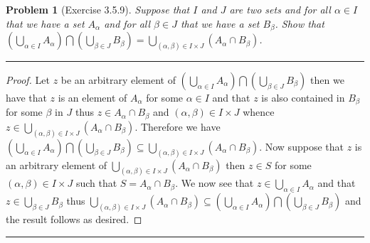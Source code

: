 \documentclass{article}
\newcommand{\lined}{\noindent\rule{\textwidth}{1pt}}
\newtheorem*{problem}{Problem}
\begin{document}
	\newpage
	
	\begin{problem}[Exercise 3.5.9]
		Suppose that $I$ and $J$ are two sets and for all $\alpha \in I$ that we have a set $A_{\alpha}$ and for all $\beta \in J$ that we have a set $B_{\beta}$. Show that $(\bigcup_{\alpha \in I}A_{\alpha}) \bigcap (\bigcup_{\beta \in J}B_{\beta}) = 
		\bigcup_{(\alpha,\beta) \in I \times J}(A_{\alpha} \cap B_{\beta})$.
	\end{problem}
	
	\lined
	\begin{proof}
		Let $z$ be an arbitrary element of $(\bigcup_{\alpha \in I}A_{\alpha}) \bigcap (\bigcup_{\beta \in J}B_{\beta})$ then we have that 
		$z$ is an element of $A_{\alpha}$ for some $\alpha \in I$ and that $z$ is also contained in $B_{\beta}$ for some $\beta$ in $J$ thus $z \in A_{\alpha} \cap B_{\beta}$ and $(\alpha,\beta) \in I \times J$ whence $z \in \bigcup_{(\alpha,\beta) \in I \times J}(A_{\alpha} \cap B_{\beta})$. Therefore we have $(\bigcup_{\alpha \in I}A_{\alpha}) \bigcap (\bigcup_{\beta \in J}B_{\beta}) \subseteq	\bigcup_{(\alpha,\beta) \in I \times J}(A_{\alpha} \cap B_{\beta})$. Now suppose that $z$ is an arbitrary element of
		$\bigcup_{(\alpha,\beta) \in I \times J}(A_{\alpha} \cap B_{\beta})$ then $z \in S$ for some $(\alpha,\beta) \in I \times J$ such
		that $S = A_{\alpha} \cap B_{\beta}$. We now see that $z \in \bigcup_{\alpha \in I} A_{\alpha}$ and that $z \in \bigcup_{\beta \in J} B_{\beta}$ thus $\bigcup_{(\alpha,\beta) \in I \times J}(A_{\alpha} \cap B_{\beta}) \subseteq (\bigcup_{\alpha \in I}A_{\alpha}) \bigcap (\bigcup_{\beta \in J}B_{\beta})$ and the result follows as desired.
		
	\end{proof}
	\lined
	
\end{document}
